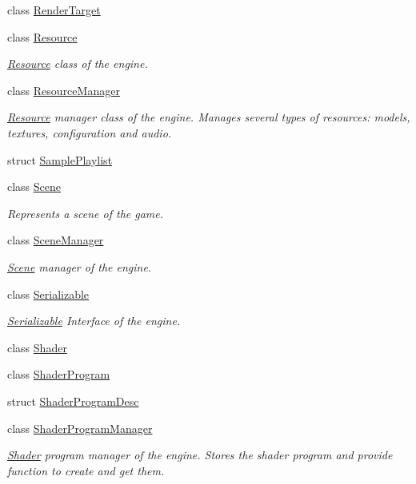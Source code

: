 \begin{DoxyCompactItemize}
class \hyperlink{class_blade_1_1_render_target}{Render\+Target}
\item 
class \hyperlink{class_blade_1_1_resource}{Resource}
\begin{DoxyCompactList}\small\item\em \hyperlink{class_blade_1_1_resource}{Resource} class of the engine. \end{DoxyCompactList}\item 
class \hyperlink{class_blade_1_1_resource_manager}{Resource\+Manager}
\begin{DoxyCompactList}\small\item\em \hyperlink{class_blade_1_1_resource}{Resource} manager class of the engine. Manages several types of resources\+: models, textures, configuration and audio. \end{DoxyCompactList}\item 
struct \hyperlink{struct_blade_1_1_sample_playlist}{Sample\+Playlist}
\item 
class \hyperlink{class_blade_1_1_scene}{Scene}
\begin{DoxyCompactList}\small\item\em Represents a scene of the game. \end{DoxyCompactList}\item 
class \hyperlink{class_blade_1_1_scene_manager}{Scene\+Manager}
\begin{DoxyCompactList}\small\item\em \hyperlink{class_blade_1_1_scene}{Scene} manager of the engine. \end{DoxyCompactList}\item 
class \hyperlink{class_blade_1_1_serializable}{Serializable}
\begin{DoxyCompactList}\small\item\em \hyperlink{class_blade_1_1_serializable}{Serializable} Interface of the engine. \end{DoxyCompactList}\item 
class \hyperlink{class_blade_1_1_shader}{Shader}
\item 
class \hyperlink{class_blade_1_1_shader_program}{Shader\+Program}
\item 
struct \hyperlink{struct_blade_1_1_shader_program_desc}{Shader\+Program\+Desc}
\item 
class \hyperlink{class_blade_1_1_shader_program_manager}{Shader\+Program\+Manager}
\begin{DoxyCompactList}\small\item\em \hyperlink{class_blade_1_1_shader}{Shader} program manager of the engine. Stores the shader program and provide function to create and get them. \end{DoxyCompactList}\item 

\end{DoxyCompactItemize}
